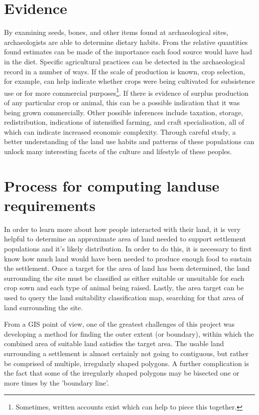 \section{Evidence} \label{sec:Evidence} By examining seeds, bones, and other
items found at archaeological sites, archaeologists are able to determine 
dietary habits. From the relative quantities found estimates can be made of the
importance each food source would have had in the diet.  Specific agricultural
practices
can be detected in the archaeological record in a number of ways.  If the scale
of production is known, crop selection, for example, can help indicate whether
crops were being cultivated for subsistence use or for more commercial
purposes\footnote{Sometimes, written accounts exist which can help to
piece this together.}.  If there is evidence of surplus production of any
particular crop or animal, this can be a possible indication that it was being
grown commercially.  Other possible inferences include taxation, storage,
redistribution, indications of intensified farming, and craft specialisation,
all of which can indicate increased economic complexity.  Through careful
study, a better understanding of the land use habits and patterns of these
populations can unlock many interesting facets of the culture and lifestyle of
these peoples.

\section{Process for computing landuse requirements} \label{sec:EarlyAttempts} 

In order to learn more about how people interacted with their land, it is very
helpful to determine an approximate area of land needed to support settlement
populations and it's likely distribution.  In order to do this, it is necessary
to first know how much land would have been needed to produce enough food to
sustain the settlement.  Once a target for the area of land has been determined, the land surrounding the
site must be classified as either suitable or unsuitable for each crop sown and
each type of animal being raised.  Lastly, the area target can be used to query the land suitability classification map, searching for that area of
land surrounding the site.

From a GIS point of view, one of the greatest challenges of this project was
developing a method for finding the outer extent (or boundary), within which
the combined area of suitable land satisfies the target area.  The usable land
surrounding a settlement is almost certainly not going to contiguous, but
rather be comprised of multiple, irregularly shaped polygons. A further
complication is the fact that some of the irregularly shaped polygons may
be bisected one or more times by the 'boundary line'.  

